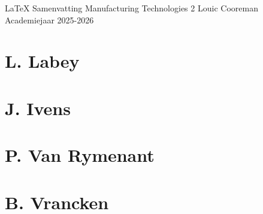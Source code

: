 \documentclass[a4paper,11pt,twoside]{report}
\begin{document}
\kuleuventitle
{LaTeX Samenvatting}
{Manufacturing Technologies 2}
{Louic Cooreman}
{Academiejaar 2025-2026}
\tableofcontents
\newpage
\section*{L. Labey}


\newpage
\section*{J. Ivens}


\newpage
\section*{P. Van Rymenant}


\newpage
\section*{B. Vrancken}

\end{document}
